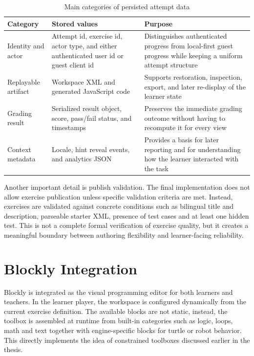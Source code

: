 \begin{table}
  \centering
  \footnotesize
  \caption{Main categories of persisted attempt data}
  \label{tab:impl-attempt-data}
  \begin{tabularx}{\textwidth}{|l|X|X|}
    \hline
    \textbf{Category}   & \textbf{Stored values}                                                                   & \textbf{Purpose}                                                                                               \\\hline
    Identity and actor  & Attempt id, exercise id, actor type, and either authenticated user id or guest client id & Distinguishes authenticated progress from local-first guest progress while keeping a uniform attempt structure \\\hline
    Replayable artifact & Workspace XML and generated JavaScript code                                              & Supports restoration, inspection, export, and later re-display of the learner state                            \\\hline
    Grading result      & Serialized result object, score, pass/fail status, and timestamps                        & Preserves the immediate grading outcome without having to recompute it for every view                          \\\hline
    Context metadata    & Locale, hint reveal events, and analytics JSON                                           & Provides a basis for later reporting and for understanding how the learner interacted with the task            \\\hline
  \end{tabularx}
\end{table}

Another important detail is publish validation.
The final implementation does not allow exercise publication unless specific validation criteria are met.
Instead, exercises are validated against concrete conditions
such as bilingual title and description, parseable starter XML, presence of test cases and
at least one hidden test.
This is not a complete formal verification of exercise quality, but it creates a meaningful
boundary between authoring flexibility and learner-facing reliability.

\section{Blockly Integration}
\label{sec:blockly-integration}
Blockly is integrated as the visual programming editor for both learners and teachers.
In the learner player, the workspace is configured dynamically from the current exercise definition.
The available blocks are not static, instead, the toolbox is assembled at runtime from built-in
categories such as logic, loops, math and text together with engine-specific blocks for
turtle or robot behavior.
This directly implements the idea of constrained toolboxes discussed earlier in the thesis.

